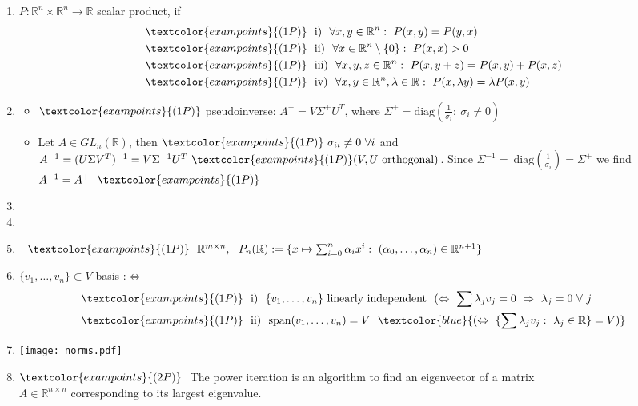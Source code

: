 {\begin{enumerate}
	\item $P:\mathbb{R}^n\times\mathbb{R}^n\rightarrow \mathbb{R}$ scalar product, if
	\begin{align*}
	&\textcolor{exampoints}{(1P)}~~\text{i)}~~\forall x,y\in\mathbb{R}^n:~P(x,y)=P(y,x)\\
	&\textcolor{exampoints}{(1P)}~~\text{ii)}~~\forall x\in\mathbb{R}^n\setminus\{0\}:~P(x,x)>0\\
	&\textcolor{exampoints}{(1P)}~~\text{iii)}~~\forall x,y,z\in\mathbb{R}^n:~P(x,y+z)=P(x,y)+P(x,z)\\
	&\textcolor{exampoints}{(1P)}~~\text{iv)}~~\forall x,y\in\mathbb{R}^n,\lambda\in\mathbb{R}:~P(x,\lambda y)=\lambda P(x,y)
	\end{align*}
	\item 
	\begin{itemize}
		\item 
		$\textcolor{exampoints}{(1P)}$ pseudoinverse: $A^+=V\Sigma^+U^T$, where $\Sigma^+=\text{diag}(\frac{1}{\sigma_i}:~\sigma_i\neq 0)$
		\item 
		Let $A\in GL_n(\mathbb{R})$, then $\textcolor{exampoints}{(1P)}~\sigma_{ii}\neq 0~\forall i$ and $A^{-1}=(U\Sigma V^T)^{-1}=V\Sigma^{-1}U^T~\textcolor{exampoints}{(1P)}~\\
		(V,U~\text{orthogonal})$. Since $\Sigma^{-1}=~\text{diag}(\frac{1}{\sigma_i})=\Sigma^+$ we find $A^{-1}=A^+~~\textcolor{exampoints}{(1P)}$
	\end{itemize}
	\item 
	\item 
	\item $~~\textcolor{exampoints}{(1P)}~~\mathbb{R}^{m\times n},~~P_n(\mathbb{R}):=\{x\mapsto\sum_{i=0}^{n}\alpha_ix^i:~(\alpha_0,\dots,\alpha_n)\in\mathbb{R}^{n+1}\}$
	\item 
	$\{v_1,\dots,v_n\}\subset V$ basis :$\Leftrightarrow$
	\begin{align*}
	&\textcolor{exampoints}{(1P)}~~\text{i)}~~\{v_1,\dots,v_n\}~\text{linearly independent}~~(\Leftrightarrow~\sum \lambda_jv_j=0~\Rightarrow~\lambda_j=0~\forall~j\\
	&\textcolor{exampoints}{(1P)}~~\text{ii)}~~\text{span}(v_1,\dots,v_n)=V~~\textcolor{blue}{(\Leftrightarrow~\{\sum \lambda_jv_j:~\lambda_j\in\mathbb{R}\}=V)}
	\end{align*}
	\item 
	\texttt{[image: norms.pdf]}	
	\item 
	$\textcolor{exampoints}{(2P)}~$ The power iteration is an algorithm to find an eigenvector of a matrix\\ $A\in\mathbb{R}^{n\times n}$ corresponding to its largest eigenvalue. 

\end{enumerate}}
